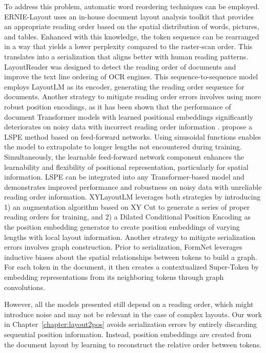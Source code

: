 To address this problem, automatic word reordering techniques can be employed. ERNIE-Layout \citep{peng2022ernie} uses an in-house document layout analysis toolkit that provides an appropriate reading order based on the spatial distribution of words, pictures, and tables. Enhanced with this knowledge, the token sequence can be rearranged in a way that yields a lower perplexity compared to the raster-scan order. This translates into a serialization that aligns better with human reading patterns. LayoutReader \citep{wang2021layoutreader} was designed to detect the reading order of documents and improve the text line ordering of \ac{OCR} engines. This sequence-to-sequence model employs LayoutLM \citep{xu2020layoutlm} as its encoder, generating the reading order sequence for documents. Another strategy to mitigate reading order errors involves using more robust position encodings, as it has been shown that the performance of document Transformer models with learned positional embeddings significantly deteriorates on noisy data with incorrect reading order information \citep{hong2020bros}. \citet{wang2022simple} propose a \ac{LSPE} method based on feed-forward networks. Using sinusoidal functions enables the model to extrapolate to longer lengths not encountered during training. Simultaneously, the learnable feed-forward network component enhances the learnability and flexibility of positional representation, particularly for spatial information. \ac{LSPE} can be integrated into any Transformer-based model and demonstrates improved performance and robustness on noisy data with unreliable reading order information. XYLayoutLM \citep{gu2022xylayoutlm} leverages both strategies by introducing 1) an augmentation algorithm based on XY Cut \citep{ha1995recursive} to generate a series of proper reading orders for training, and 2) a Dilated Conditional Position Encoding as the position embedding generator to create position embeddings of varying lengths with local layout information. Another strategy to mitigate serialization errors involves graph construction. Prior to serialization, FormNet \citep{lee2022formnet} leverages inductive biases about the spatial relationships between tokens to build a graph. For each token in the document, it then creates a contextualized Super-Token by embedding representations from its neighboring tokens through graph convolutions.

However, all the models presented still depend on a reading order, which might introduce noise and may not be relevant in the case of complex layouts. Our work in Chapter~\ref{chapter:layout2pos} avoids serialization errors by entirely discarding sequential position information. Instead, position embeddings are created from the document layout by learning to reconstruct the relative order between tokens.

